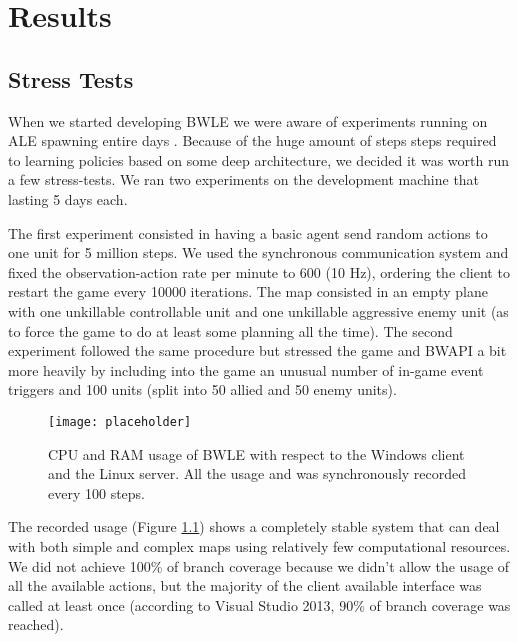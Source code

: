 \chapter{Results}


\section{Stress Tests}

When we started developing BWLE we were aware of experiments running on ALE
spawning entire days \citep{mnih2015human}. Because of the huge amount of steps
steps required to learning policies based on some deep architecture, we decided
it was worth run a few stress-tests. We ran two experiments on the development
machine that lasting 5 days each.

The first experiment consisted in having a basic agent send random actions to
one unit for 5 million steps. We used the synchronous communication system and
fixed the observation-action rate per minute to 600 (10 Hz), ordering the client
to restart the game every 10000 iterations. The map consisted in an empty plane
with one unkillable controllable unit and one unkillable aggressive enemy unit
(as to force the game to do at least some planning all the time). The second
experiment followed the same procedure but stressed the game and BWAPI a bit
more heavily by including into the game an unusual number of in-game event
triggers and 100 units (split into 50 allied and 50 enemy units).

\begin{figure}[h]
    \centering
    \texttt{[image: placeholder]}
    \caption{CPU and RAM usage of BWLE with respect to the Windows client and
      the Linux server. All the usage and was synchronously recorded every 100
      steps.}
    \label{fig:fst_usage}
\end{figure}

The recorded usage (Figure \ref{fig:fst_usage}) shows a completely stable system
that can deal with both simple and complex maps using relatively few
computational resources. We did not achieve 100\% of branch coverage because we
didn't allow the usage of all the available actions, but the majority of the
client available interface was called at least once (according to Visual Studio
2013, 90\% of branch coverage was reached).


